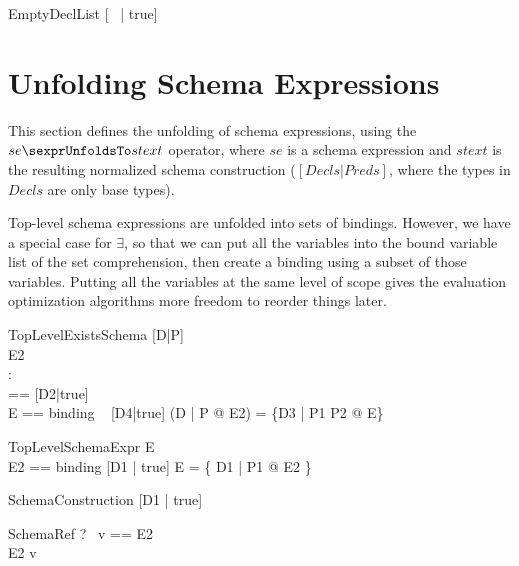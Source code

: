 \documentclass{article}
\begin{document}
\begin{zedrule}{EmptyDeclList}
   [~ | true] \declListUnfoldsTo [~ | true]
\end{zedrule}


\section{Unfolding Schema Expressions}

This section defines the unfolding of schema expressions,
using the $se \sexprUnfoldsTo stext$ operator, where $se$
is a schema expression and $stext$ is the resulting normalized
schema construction ($[Decls|Preds]$, where the types in $Decls$
are only base types).

Top-level schema expressions are unfolded into sets of bindings.
However, we have a special case for $\exists$, so that we can
put all the variables into the bound variable list of the
set comprehension, then create a binding using a subset of
those variables.  Putting all the variables at the same level
of scope gives the evaluation optimization algorithms more
freedom to reorder things later.

\begin{zedrule}{TopLevelExistsSchema}
   [D|P] \sexprUnfoldsTo [D1 | P1] \\
   E2 \sexprUnfoldsTo [D2 | P2] \\
   \proviso [D1 | true] \land [D2 | true] : \power [D3] \\
   \proviso [D4|true] == [D2|true] \schemaminus [D1|true] \\
   \proviso E == binding ~ [D4|true]
\derives
   (\exists D | P @ E2) = \{D3 | P1 \land P2 @ E\}
\end{zedrule}

\begin{zedrule}{TopLevelSchemaExpr}
  E \sexprUnfoldsTo [D1|P1] \\
  \proviso E2 == binding [D1 | true]
\derives
  E = \{ D1 | P1 @ E2 \}
\end{zedrule}


\begin{zedrule}{SchemaConstruction}
   [D1 | true] \declListUnfoldsTo [D2 | P2]
\derives
   [D1 | P] \sexprUnfoldsTo [D2 | P2 \land P]
\end{zedrule}

\begin{zedrule}{SchemaRef}
  \proviso ?~ v == E2 \\
  E2 \sexprUnfoldsTo [D2 | P2]
\derives
  v \sexprUnfoldsTo [D2 | P2]
\end{zedrule}
\end{document}
